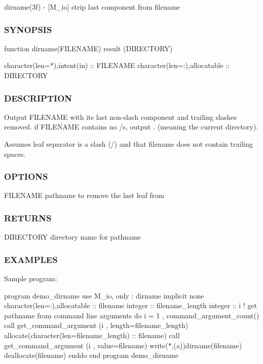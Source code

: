 dirname(3f) -\/ \mbox{[}M\+\_\+io\mbox{]} strip last component from filename 

\subsubsection*{S\+Y\+N\+O\+P\+S\+IS}

\begin{DoxyVerb}function dirname(FILENAME) result (DIRECTORY)

  character(len=*),intent(in)  :: FILENAME
  character(len=:),allocatable :: DIRECTORY
\end{DoxyVerb}


\subsubsection*{D\+E\+S\+C\+R\+I\+P\+T\+I\+ON}

Output F\+I\+L\+E\+N\+A\+ME with its last non-\/slash component and trailing slashes removed. if F\+I\+L\+E\+N\+A\+ME contains no /\textquotesingle{}s, output \textquotesingle{}.\textquotesingle{} (meaning the current directory).

Assumes leaf separator is a slash (\textquotesingle{}/\textquotesingle{}) and that filename does not contain trailing spaces.

\subsubsection*{O\+P\+T\+I\+O\+NS}

F\+I\+L\+E\+N\+A\+ME pathname to remove the last leaf from

\subsubsection*{R\+E\+T\+U\+R\+NS}

D\+I\+R\+E\+C\+T\+O\+RY directory name for pathname

\subsubsection*{E\+X\+A\+M\+P\+L\+ES}

Sample program\+:

program demo\+\_\+dirname use M\+\_\+io, only \+: dirname implicit none character(len=\+:),allocatable \+:\+: filename integer \+:\+: filename\+\_\+length integer \+:\+: i ! get pathname from command line arguments do i = 1 , command\+\_\+argument\+\_\+count() call get\+\_\+command\+\_\+argument (i , length=filename\+\_\+length) allocate(character(len=filename\+\_\+length) \+:\+: filename) call get\+\_\+command\+\_\+argument (i , value=filename) write($\ast$,\textquotesingle{}(a)\textquotesingle{})dirname(filename) deallocate(filename) enddo end program demo\+\_\+dirname


